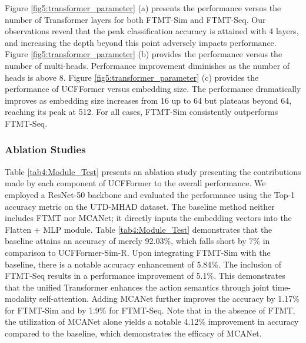 Figure \ref{fig5:transformer_parameter} (a) presents the performance versus the number of Transformer layers for both FTMT-Sim and FTMT-Seq. Our observations reveal that the peak classification accuracy is attained with 4 layers, and increasing the depth beyond this point adversely impacts performance. 
Figure \ref{fig5:transformer_parameter} (b) provides the performance versus the number of multi-heads. Performance improvement diminishes as the number of heads is above 8. Figure \ref{fig5:transformer_parameter} (c) provides the performance of UCFFormer versus embedding size. The performance dramatically improves as embedding size increases from 16 up to 64 but plateaus beyond 64, reaching its peak at 512. For all cases, FTMT-Sim consistently outperforms FTMT-Seq. 

\subsubsection{Ablation Studies} 
Table \ref{tab4:Module_Test} presents an ablation study presenting the contributions made by each component of UCFFormer to the overall performance.  We employed a ResNet-50 backbone and evaluated the performance using the Top-1 accuracy metric on the UTD-MHAD dataset. The baseline method neither includes FTMT nor MCANet; it directly inputs the embedding vectors into the Flatten + MLP module.  Table \ref{tab4:Module_Test} demonstrates that the baseline attains an accuracy of merely 92.03\%, which falls short by 7\% in comparison to UCFFormer-Sim-R. Upon integrating FTMT-Sim with the baseline, there is a notable accuracy enhancement of 5.84\%. The inclusion of FTMT-Seq results in a performance improvement of 5.1\%. This demonstrates that the unified Transformer enhances the action semantics through joint time-modality self-attention. Adding MCANet further improves the accuracy by 1.17\% for FTMT-Sim and by 1.9\% for FTMT-Seq. Note that in the absence of FTMT, the utilization of MCANet alone yields a notable 4.12\% improvement in accuracy compared to the baseline, which demonstrates the efficacy of MCANet.   




